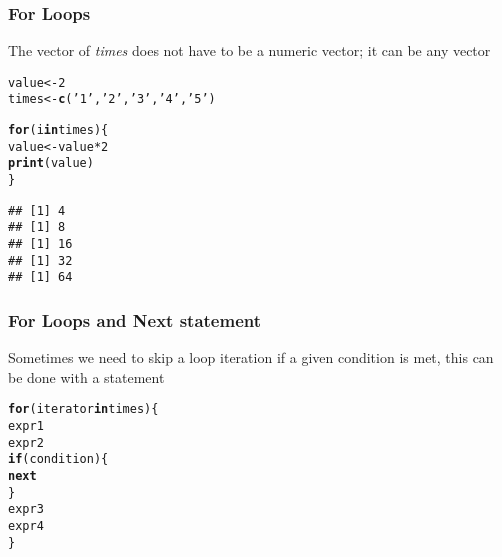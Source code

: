 \documentclass[12pt]{beamer}\usepackage[]{graphicx}\usepackage[]{color}
\makeatletter
\newcommand{\hlnum}[1]{\textcolor[rgb]{0.686,0.059,0.569}{#1}}%
\newcommand{\hlstr}[1]{\textcolor[rgb]{0.192,0.494,0.8}{#1}}%
\newcommand{\hlopt}[1]{\textcolor[rgb]{0,0,0}{#1}}%
\newcommand{\hlstd}[1]{\textcolor[rgb]{0.345,0.345,0.345}{#1}}%
\newcommand{\hlkwa}[1]{\textcolor[rgb]{0.161,0.373,0.58}{\textbf{#1}}}%
\newcommand{\hlkwb}[1]{\textcolor[rgb]{0.69,0.353,0.396}{#1}}%
\newcommand{\hlkwd}[1]{\textcolor[rgb]{0.737,0.353,0.396}{\textbf{#1}}}%
\newenvironment{kframe}{%
 \def\at@end@of@kframe{}%
 \ifinner\ifhmode%
  \def\at@end@of@kframe{\end{minipage}}%
  \begin{minipage}{\columnwidth}%
 \fi\fi%
 \def\FrameCommand##1{\hskip\@totalleftmargin \hskip-\fboxsep
 \colorbox{shadecolor}{##1}\hskip-\fboxsep
     \hskip-\linewidth \hskip-\@totalleftmargin \hskip\columnwidth}%
 \MakeFramed {\advance\hsize-\width
   \@totalleftmargin\z@ \linewidth\hsize
   \@setminipage}}%
 {\par\unskip\endMakeFramed%
 \at@end@of@kframe}
\newenvironment{knitrout}{}{} %
\makeatother
\begin{document}
\begin{frame}[fragile]
\frametitle{For Loops}

The vector of \textit{times} does not have to be a numeric vector; it can be any vector
\begin{knitrout}\footnotesize
{}\color{fgcolor}\begin{kframe}
\begin{alltt}
\hlstd{value} \hlkwb{<-} \hlnum{2}
\hlstd{times} \hlkwb{<-} \hlkwd{c}\hlstd{(}\hlstr{'1'}\hlstd{,} \hlstr{'2'}\hlstd{,} \hlstr{'3'}\hlstd{,} \hlstr{'4'}\hlstd{,} \hlstr{'5'}\hlstd{)}

\hlkwa{for} \hlstd{(i} \hlkwa{in} \hlstd{times) \{}
  \hlstd{value} \hlkwb{<-} \hlstd{value} \hlopt{*} \hlnum{2}
  \hlkwd{print}\hlstd{(value)}
\hlstd{\}}
\end{alltt}
\begin{verbatim}
## [1] 4
## [1] 8
## [1] 16
## [1] 32
## [1] 64
\end{verbatim}
\end{kframe}
\end{knitrout}

\end{frame}


\begin{frame}[fragile]
\frametitle{For Loops and Next statement}

Sometimes we need to skip a loop iteration if a given condition is met, this can be done with a  statement
\begin{knitrout}\footnotesize
{}\color{fgcolor}\begin{kframe}
\begin{alltt}
\hlkwa{for} \hlstd{(iterator} \hlkwa{in} \hlstd{times) \{}
  \hlstd{expr1}
  \hlstd{expr2}
  \hlkwa{if} \hlstd{(condition) \{}
    \hlkwa{next}
  \hlstd{\}}
  \hlstd{expr3}
  \hlstd{expr4}
\hlstd{\}}
\end{alltt}
\end{kframe}
\end{knitrout}

\end{frame}

\end{document}
